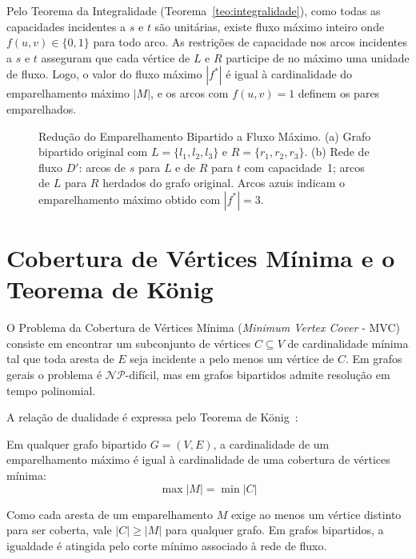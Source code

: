 Pelo Teorema da Integralidade (Teorema~\ref{teo:integralidade}), como todas as capacidades incidentes a $s$ e $t$ são unitárias, existe fluxo máximo inteiro onde $f(u,v) \in \{0, 1\}$ para todo arco. As restrições de capacidade nos arcos incidentes a $s$ e $t$ asseguram que cada vértice de $L$ e $R$ participe de no máximo uma unidade de fluxo. Logo, o valor do fluxo máximo $|f^*|$ é igual à cardinalidade do emparelhamento máximo $|M|$, e os arcos com $f(u,v) = 1$ definem os pares emparelhados.

\begin{figure}[!ht]
\centering

\caption{Redução do Emparelhamento Bipartido a Fluxo Máximo. (a) Grafo bipartido original com $L = \{l_1,l_2,l_3\}$ e $R = \{r_1,r_2,r_3\}$. (b) Rede de fluxo $D'$: arcos de $s$ para $L$ e de $R$ para $t$ com capacidade~1; arcos de $L$ para $R$ herdados do grafo original. Arcos azuis indicam o emparelhamento máximo obtido com $|f^*|=3$.}
\label{fig:fluxo_bipartido}
\end{figure}


\section{Cobertura de Vértices Mínima e o Teorema de König}\label{sec:cobertura}

O Problema da Cobertura de Vértices Mínima (\textit{Minimum Vertex Cover} - MVC) consiste em encontrar um subconjunto de vértices $C \subseteq V$ de cardinalidade mínima tal que toda aresta de $E$ seja incidente a pelo menos um vértice de $C$. Em grafos gerais o problema é $\mathcal{NP}$-difícil, mas em grafos bipartidos admite resolução em tempo polinomial.

A relação de dualidade é expressa pelo Teorema de König~\cite{korte2018combinatorial}:

\begin{teorema}
Em qualquer grafo bipartido $G = (V, E)$, a cardinalidade de um emparelhamento máximo é igual à cardinalidade de uma cobertura de vértices mínima:
\begin{equation}
    \max |M| = \min |C|
\end{equation}
\end{teorema}

 Como cada aresta de um emparelhamento $M$ exige ao menos um vértice distinto para ser coberta, vale $|C| \ge |M|$ para qualquer grafo. Em grafos bipartidos, a igualdade é atingida pelo corte mínimo associado à rede de fluxo.

